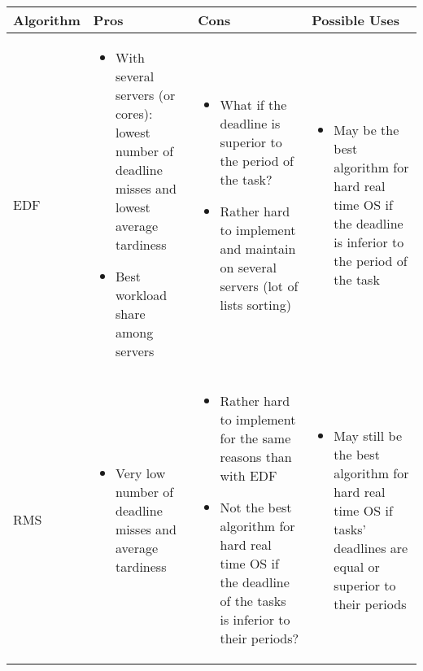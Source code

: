 \documentclass[./report.tex]{subfiles}
\begin{document}
\begin{tabular}{|m{8em}|m{12em}|m{12em}|m{12em}|} 
	\hline 
	\textbf{Algorithm} & \textbf{Pros} & \textbf{Cons} & \textbf{Possible Uses} \\ 
	\hline
	EDF 
	&  
	\begin{itemize}[leftmargin=*]
		\item With several servers (or cores): lowest number of deadline misses and lowest average tardiness
		\item Best workload share among servers
	\end{itemize}
	&  
	\begin{itemize}[leftmargin=*]
		\item What if the deadline is superior to the period of the task?
		\item Rather hard to implement and maintain on several servers (lot of lists sorting)
	\end{itemize}
	& 
	\begin{itemize}[leftmargin=*]
		\item May be the best algorithm for hard real time OS if the deadline is inferior to the period of the task
	\end{itemize}
	\\
	\hline
	RMS 
	& 
	\begin{itemize}[leftmargin=*]
		\item Very low number of deadline misses and average tardiness
	\end{itemize} 
	&  
	\begin{itemize}[leftmargin=*]
		\item Rather hard to implement for the same reasons than with EDF
		\item Not the best algorithm for hard real time OS if the deadline of the tasks is inferior to their periods?
	\end{itemize}
	& 
	\begin{itemize}[leftmargin=*]
		\item May still be the best algorithm for hard real time OS if tasks' deadlines are equal or superior to their periods
	\end{itemize}
	\\
	\hline
\end{tabular}
\end{document}
